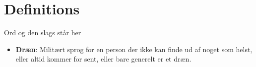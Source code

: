 \chapter{Definitions}\label{ch:definitions}
Ord og den slags står her
\begin{itemize}
	\item \textbf{Dræn}: Militært sprog for en person der ikke kan finde ud af noget som helst, eller altid kommer for sent, eller bare generelt er et dræn.
\end{itemize}
